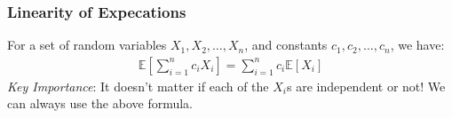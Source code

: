 \documentclass{beamer}
\begin{document}
\begin{frame}
    \frametitle{Linearity of Expecations}
    For a set of random variables $X_1,X_2,\dots,X_n$, and constants $c_1,c_2,\dots,c_n$, we have:
    \begin{gather*}
        \mathbb{E}\left[\sum_{i=1}^nc_iX_i\right]=\sum_{i=1}^nc_i\mathbb{E}[X_i]
    \end{gather*}
    {\it Key Importance}: It doesn't matter if each of the $X_i$s are independent or not! We can always use the above formula.
\end{frame}
\end{document}
